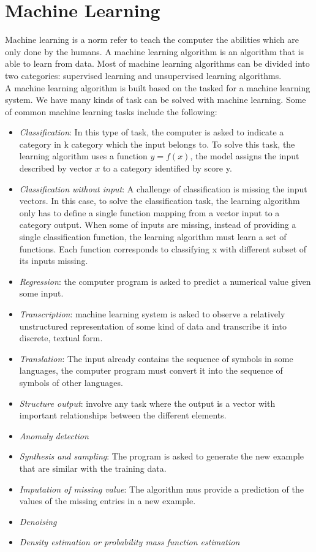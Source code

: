 \chapter{Machine Learning}
Machine learning is a norm refer to teach the computer the abilities which are only done by the humans. A machine learning algorithm is an algorithm that is able to learn from data. Most of machine learning algorithms can be divided into two categories: supervised learning and unsupervised learning algorithms. \\
A machine learning algorithm is built based on the tasked for a machine learning system. We have many kinds of task can be solved with machine learning. Some of common machine learning tasks include the following:
\begin{itemize}
	\item \textit{Classification}: In this type of task, the computer is asked to indicate a category in k category which the input belongs to. To solve this task, the learning algorithm uses a function $y=f(x)$, the model assigns the input described by vector $x$ to a category identified by score y.
	\item \textit{Classification without input}: A challenge of classification is missing the input vectors. In this case, to solve the classification task, the learning algorithm only has to define a single function mapping from a vector input to a category output. When some of inputs are missing, instead of providing a single classification function, the learning algorithm must learn a set of functions. Each function corresponds to classifying x with different subset of its inputs missing.
	\item \textit{Regression}: the computer program is asked to predict a numerical value given some input.
	\item \textit{Transcription}: machine learning system is asked to observe a relatively unstructured representation of some kind of data and transcribe it into discrete, textual form.
	\item \textit{Translation}: The input already contains the sequence of symbols in some languages, the computer program must convert it into the sequence of symbols of other languages.
	\item \textit{Structure output}: involve any task where the output is a vector with important relationships between the different elements.
	\item \textit{Anomaly detection}
	\item \textit{Synthesis and sampling}: The program is asked to generate the new example that are similar with the training data.
	\item \textit{Imputation of missing value}: The algorithm mus provide a prediction of the values of the missing entries in a new example.
	\item \textit{Denoising}
	\item \textit{Density estimation or probability mass function estimation}
\end{itemize}
